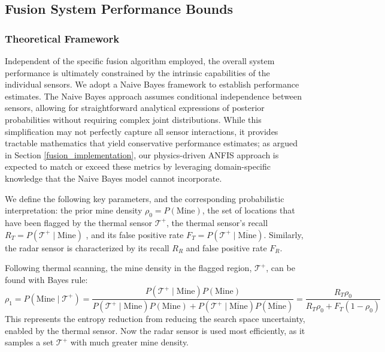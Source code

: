 \subsection{Fusion System Performance Bounds}\label{fusion_bounds}

    \subsubsection{Theoretical Framework}
    
        Independent of the specific fusion algorithm employed, the overall system performance is ultimately constrained by the intrinsic capabilities of the individual sensors. We adopt a Naive Bayes framework to establish performance estimates. The Naive Bayes approach assumes conditional independence between sensors, allowing for straightforward analytical expressions of posterior probabilities without requiring complex joint distributions. While this simplification may not perfectly capture all sensor interactions, it provides tractable mathematics that yield conservative performance estimates; as argued in Section \ref{fusion_implementation}, our physics-driven ANFIS approach is expected to match or exceed these metrics by leveraging domain-specific knowledge that the Naive Bayes model cannot incorporate. 
        
        We define the following key parameters, and the corresponding probabilistic interpretation: the prior mine density $\rho_0 = P(\text{Mine})$, the set of locations that have been flagged by the thermal sensor \(\mathcal{T}^+\), the thermal sensor's recall $R_T = P(\mathcal{T}^+\mid\text{Mine})$ , and its false positive rate $F_T = P(\mathcal{T}^+ \mid \overline{\text{Mine}})$. Similarly, the radar sensor is characterized by its recall $R_R$ and false positive rate $F_R$.
        
        Following thermal scanning, the mine density in the flagged region, $\mathcal{T}^+$, can be found with Bayes rule:
        \[
        \rho_1 = P(\text{Mine} \mid \mathcal{T}^+) =\frac{P(\mathcal{T}^+\mid\text{Mine})P(\text{Mine})}{P(\mathcal{T}^+\mid\text{Mine})P(\text{Mine})+ P(\mathcal{T}^+\mid \overline{\text{Mine}})P(\overline{\text{Mine}})} =\frac{R_T \rho_0}{R_T \rho_0 + F_T (1 - \rho_0)}
        \]
        This represents the entropy reduction from reducing the search space uncertainty, enabled by the thermal sensor. Now the radar sensor is used most efficiently, as it samples a set \(\mathcal{T}^+\) with much greater mine density. 
        

